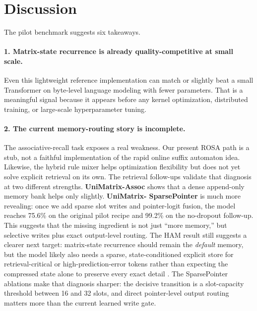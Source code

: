\documentclass[11pt]{article}
\begin{document}
\section{Discussion}
The pilot benchmark suggests six takeaways.

\paragraph{1. Matrix-state recurrence is already quality-competitive at small scale.}
Even this lightweight reference implementation can match or slightly beat a
small Transformer on byte-level language modeling with fewer parameters. That
is a meaningful signal because it appears before any kernel optimization,
distributed training, or large-scale hyperparameter tuning.

\paragraph{2. The current memory-routing story is incomplete.}
The associative-recall task exposes a real weakness. Our present ROSA path is a
stub, not a faithful implementation of the rapid online suffix automaton idea.
Likewise, the hybrid rule mixer helps optimization flexibility but does not yet
solve explicit retrieval on its own. The retrieval follow-ups validate that
diagnosis at two different strengths. \textbf{UniMatrix-Assoc} shows that a
dense append-only memory bank helps only slightly. \textbf{UniMatrix-
SparsePointer} is much more revealing: once we add sparse slot writes and
pointer-logit fusion, the model reaches 75.6\% on the original pilot recipe
and 99.2\% on the no-dropout follow-up. This suggests that the missing
ingredient is not just ``more memory,'' but selective writes plus exact
output-level routing. The HAM result still suggests a clearer next target:
matrix-state recurrence should remain the \emph{default} memory, but the model
likely also needs a sparse, state-conditioned explicit store for
retrieval-critical or high-prediction-error tokens rather than expecting the
compressed state alone to preserve every exact detail \citep{ham2026}. The
SparsePointer ablations make that diagnosis sharper: the decisive transition is
a slot-capacity threshold between 16 and 32 slots, and direct pointer-level
output routing matters more than the current learned write gate.
\end{document}
